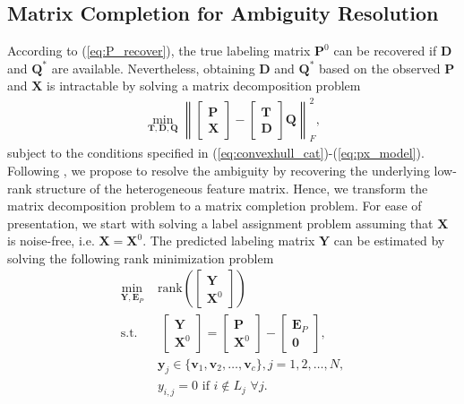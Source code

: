 \documentclass[10pt,journal,compsoc]{IEEEtran}
\begin{document}
\subsection{Matrix Completion for Ambiguity Resolution} \label{subsec:ambiguous_LR}
According to (\ref{eq:P_recover}), the true labeling matrix $\mathbf{P}^0$ can be recovered if $\mathbf{D}$ and $\mathbf{Q}^*$ are available. Nevertheless, obtaining $\mathbf{D}$ and $\mathbf{Q}^*$ based on the observed $\mathbf{P}$ and $\mathbf{X}$ is intractable by solving a matrix decomposition problem
\begin{equation}
\begin{aligned}
\min_{\mathbf{T}, \mathbf{D}, \mathbf{Q}} \left\|
\begin{bmatrix}
\mathbf{P} \\
\mathbf{X}
\end{bmatrix}
-
\begin{bmatrix}
\mathbf{T} \\
\mathbf{D}
\end{bmatrix}\mathbf{Q}
\right\|_F^2,
\end{aligned}\label{eqn:MatrixDecomp}
\end{equation}
subject to the conditions specified in (\ref{eq:convexhull_cat})-(\ref{eq:px_model}).
Following \cite{Goldberg2010}, we propose to resolve the ambiguity by recovering the underlying low-rank structure of the heterogeneous feature matrix.
Hence, we transform the matrix decomposition problem to a matrix completion problem.
For ease of presentation, we start with solving a label assignment problem assuming that $\mathbf{X}$ is noise-free, i.e. $\mathbf{X} = \mathbf{X}^0$. The predicted labeling matrix $\mathbf{Y}$ can be estimated by solving the following rank minimization problem
\begin{equation}
\begin{aligned}
 \min_{\mathbf{Y}, \mathbf{E}_P} \,\, & \mathrm{rank} \left(\begin{bmatrix}
\mathbf{Y} \\
\mathbf{X}^0
\end{bmatrix}\right) \\
 \text{s.t.} & \;
\begin{bmatrix}
\mathbf{Y} \\
\mathbf{X}^0
\end{bmatrix}= \begin{bmatrix}
\mathbf{P} \\
\mathbf{X}^0
\end{bmatrix} - \begin{bmatrix}
\mathbf{E}_P \\
\mathbf{0}
\end{bmatrix},\\
& \mathbf{y}_j \in \{\mathbf{v}_1, \mathbf{v}_2, \dots, \mathbf{v}_c\}, j = 1, 2, \dots, N,\\
& y_{i,j} = 0 \,\, \mathrm{if}  \,\, i \notin L_j \,\, \forall j. \\
\end{aligned}\label{eqn:Hard_NoiseFree}
\end{equation}
\end{document}
